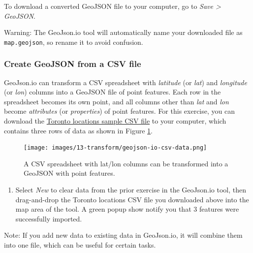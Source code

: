 \documentclass[
  english,
]{book}
\providecommand{\tightlist}{%
  \setlength{\itemsep}{0pt}\setlength{\parskip}{0pt}}
\begin{document}
To download a converted GeoJSON file to your computer, go to \emph{Save \textgreater{} GeoJSON}.

Warning: The GeoJson.io tool will automatically name your downloaded file as \texttt{map.geojson}, so rename it to avoid confusion.

\hypertarget{create-geojson-from-a-csv-file}{%
\subsubsection*{Create GeoJSON from a CSV file}\label{create-geojson-from-a-csv-file}}

GeoJson.io can transform a CSV spreadsheet with \emph{latitude} (or \emph{lat}) and \emph{longitude} (or \emph{lon})
columns into a GeoJSON file of point features. Each row in the spreadsheet
becomes its own point, and all columns other than \emph{lat} and \emph{lon}
become \emph{attributes} (or \emph{properties}) of point features. For this exercise, you can download the \href{data/toronto-locations-sample.csv}{Toronto locations sample CSV file} to your computer, which contains three rows of data as shown in Figure \ref{fig:geojson-io-csv-data}.



\begin{figure}
\centering
\texttt{[image: images/13-transform/geojson-io-csv-data.png]}
\caption{\label{fig:geojson-io-csv-data}A CSV spreadsheet with lat/lon columns can be transformed into a GeoJSON with point features.}
\end{figure}

\begin{enumerate}
\def\labelenumi{\arabic{enumi}.}
\tightlist
\item
  Select \emph{New} to clear data from the prior exercise in the GeoJson.io tool, then drag-and-drop the Toronto locations CSV file you downloaded above into the map area of the tool. A green popup show notify you that 3 features were successfully imported.
\end{enumerate}

Note: If you add new data to existing data in GeoJson.io, it will combine them into one file, which can be useful for certain tasks.
\end{document}
